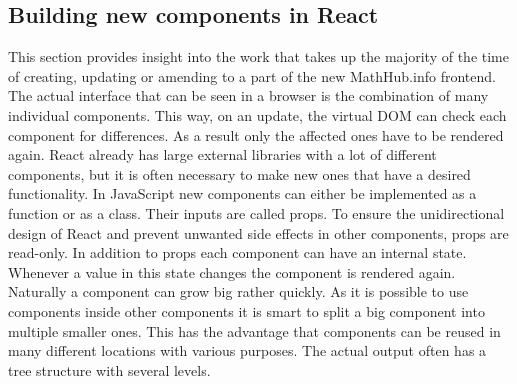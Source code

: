\documentclass[11pt,a4paper]{article}
\begin{document}
\subsection{Building new components in React} \label{components} 
This section provides insight into the work that takes up the majority of the time of creating, updating or amending to a part of the new MathHub.info frontend. 
The actual interface that can be seen in a browser is the combination of many individual components.
This way, on an update, the virtual DOM can check each component for differences.
As a result only the affected ones have to be rendered again.
\newline \newline
React already has large external libraries with a lot of different components, but it is often necessary to make new ones that have a desired functionality.
In JavaScript new components can either be implemented as a function or as a class.
Their inputs are called props.
To ensure the unidirectional design of React and prevent unwanted side effects in other components, props are read-only.
In addition to props each component can have an internal state.
Whenever a value in this state changes the component is rendered again.
Naturally a component can grow big rather quickly.
As it is possible to use components inside other components it is smart to split a big component into multiple smaller ones.
This has the advantage that components can be reused in many different locations with various purposes.
The actual output often has a tree structure with several levels.
\end{document}
